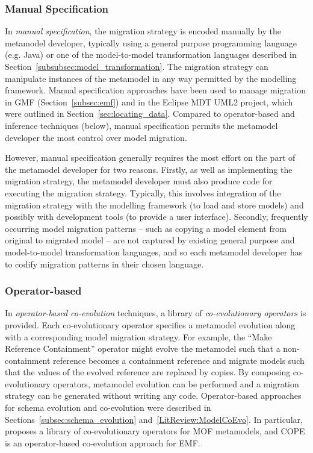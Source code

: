 \subsubsection{Manual Specification}
In \emph{manual specification}, the migration strategy is encoded manually by the metamodel developer, typically using a general purpose programming language (e.g. Java) or one of the model-to-model transformation languages described in Section~\ref{subsubsec:model_transformation}. The migration strategy can manipulate instances of the metamodel in any way permitted by the modelling framework. Manual specification approaches have been used to manage migration in GMF (Section~\ref{subsec:emf}) and in the Eclipse MDT UML2 project, which were outlined in Section~\ref{sec:locating_data}. Compared to operator-based and inference techniques (below), manual specification permits the metamodel developer the most control over model migration.

However, manual specification generally requires the most effort on the part of the metamodel developer for two reasons. Firstly, as well as implementing the migration strategy, the metamodel developer must also produce code for executing the migration strategy. Typically, this involves integration of the migration strategy with the modelling framework (to load and store models) and possibly with development tools (to provide a user interface). Secondly, frequently occurring model migration patterns -- such as copying a model element from original to migrated model -- are not captured by existing general purpose and model-to-model transformation languages, and so each metamodel developer has to codify migration patterns in their chosen language.

\subsubsection{Operator-based}
\label{subsec:operator-based_co-evolution}
In \emph{operator-based co-evolution} techniques, a library of \emph{co-evolutionary operators} is provided. Each co-evolutionary operator specifies a metamodel evolution along with a corresponding model migration strategy. For example, the ``Make Reference Containment'' operator might evolve the metamodel such that a non-containment reference becomes a containment reference and migrate models such that the values of the evolved reference are replaced by copies. By composing co-evolutionary operators, metamodel evolution can be performed and a migration strategy can be generated without writing any code. Operator-based approaches for schema evolution and co-evolution were described in Sections~\ref{subsec:schema_evolution} and~\ref{LitReview:ModelCoEvo}. In particular, \cite{wachsmuth07metamodel} proposes a library of co-evolutionary operators for MOF metamodels, and COPE \cite{herrmannsdoerfer09cope} is an operator-based co-evolution approach for EMF.

